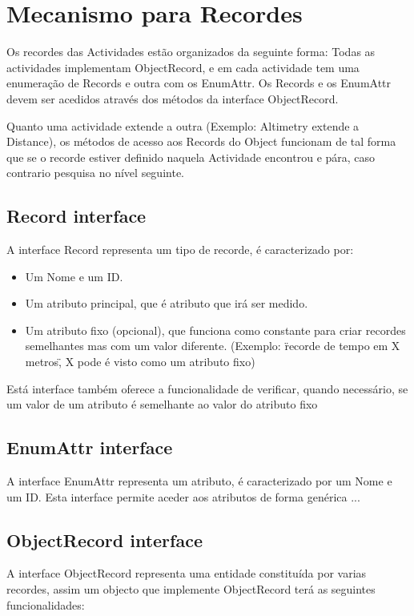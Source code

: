 \section{Mecanismo para Recordes}
Os recordes das Actividades estão organizados da seguinte forma: Todas as actividades implementam ObjectRecord, e em cada actividade tem uma enumeração de Records e outra com os EnumAttr.
Os Records e os EnumAttr devem ser acedidos através dos métodos da interface ObjectRecord.

Quanto uma actividade extende a outra (Exemplo: Altimetry extende a Distance), os métodos de acesso aos Records do Object funcionam de tal forma que se o recorde estiver definido naquela Actividade encontrou e pára, caso contrario pesquisa no nível seguinte.

\subsection{Record interface}
\label{sec:interface}
A interface Record representa um tipo de recorde, é caracterizado por:
\begin{itemize}
 \item Um Nome e um ID. 
 \item Um atributo principal, que é atributo que irá ser medido.
 \item Um atributo fixo (opcional), que funciona como constante para criar recordes semelhantes mas com um valor diferente. (Exemplo: \"recorde de tempo em X metros\", X pode é visto como um atributo fixo)
\end{itemize}
Está interface também oferece a funcionalidade de verificar, quando necessário, se um valor de um atributo é semelhante ao valor do atributo fixo

\subsection{EnumAttr interface}
\label{sec:interface}
A interface EnumAttr representa um atributo, é caracterizado por um Nome e um ID. Esta interface permite aceder aos atributos de forma genérica ...

\subsection{ObjectRecord interface}
\label{sec:interface}
A interface ObjectRecord representa uma entidade constituída por varias recordes, assim um objecto que implemente ObjectRecord terá as seguintes funcionalidades:

